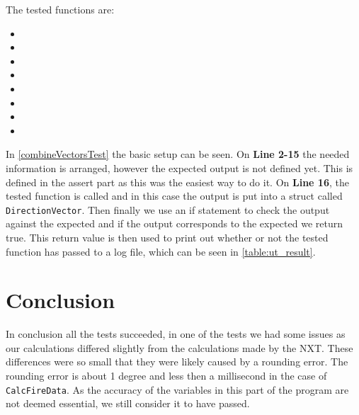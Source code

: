 The tested functions are:

\begin{itemize}
  \item {}
  \item {}
  \item {}
  \item {}
  \item {}
  \item {}
  \item {}
  \item {}
\end{itemize} 

In \autoref{combineVectorsTest} the basic setup can be seen. On \textbf{Line
2-15} the needed information is arranged, however the expected output is not
defined yet. This is defined in the assert part as this was the easiest way to
do it. On \textbf{Line 16}, the tested function is called and in this case the
output is put into a struct called \texttt{DirectionVector}. Then finally we use
an if statement to check the output against the expected and if the output
corresponds to the expected we return true. This return value is then used to
print out whether or not the tested function has passed to a log file, which can
be seen in \autoref{table:ut_result}.\nl


\section{Conclusion}
In conclusion all the tests succeeded, in one of the tests we had some
issues as our calculations differed slightly from the calculations made by the
NXT. These differences were so small that they were likely caused by a rounding
error. The rounding error is about 1 degree and less then a millisecond in the
case of \texttt{CalcFireData}. As the accuracy of the variables in this part
of the program are not deemed essential, we still consider it to have passed.
